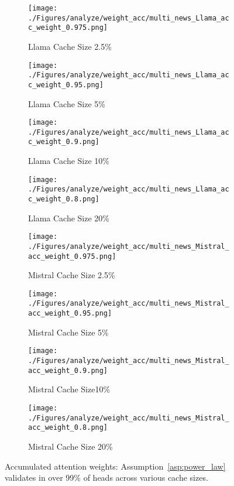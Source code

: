 {\begin{figure}[t]
	\begin{subfigure}[b]{0.245\linewidth}
		\texttt{[image: ./Figures/analyze/weight\_acc/multi\_news\_Llama\_acc\_weight\_0.975.png]}
		\caption{Llama Cache Size 2.5\%}
	\end{subfigure}
	\begin{subfigure}[b]{0.245\linewidth}
		\texttt{[image: ./Figures/analyze/weight\_acc/multi\_news\_Llama\_acc\_weight\_0.95.png]}
		\caption{Llama Cache Size 5\%}
	\end{subfigure}
	\begin{subfigure}[b]{0.245\linewidth}
		\texttt{[image: ./Figures/analyze/weight\_acc/multi\_news\_Llama\_acc\_weight\_0.9.png]}
		\caption{Llama Cache Size 10\%}
	\end{subfigure}
	\begin{subfigure}[b]{0.245\linewidth}
		\texttt{[image: ./Figures/analyze/weight\_acc/multi\_news\_Llama\_acc\_weight\_0.8.png]}
		\caption{Llama Cache Size 20\%}
	\end{subfigure}


	\begin{subfigure}[b]{0.245\linewidth}
		\texttt{[image: ./Figures/analyze/weight\_acc/multi\_news\_Mistral\_acc\_weight\_0.975.png]}
		\caption{Mistral Cache Size 2.5\%}
	\end{subfigure}
	\begin{subfigure}[b]{0.245\linewidth}
		\texttt{[image: ./Figures/analyze/weight\_acc/multi\_news\_Mistral\_acc\_weight\_0.95.png]}
		\caption{Mistral Cache Size 5\%}
	\end{subfigure}
	\begin{subfigure}[b]{0.245\linewidth}
		\texttt{[image: ./Figures/analyze/weight\_acc/multi\_news\_Mistral\_acc\_weight\_0.9.png]}
		\caption{Mistral Cache Size10\%}
	\end{subfigure}
	\begin{subfigure}[b]{0.245\linewidth}
		\texttt{[image: ./Figures/analyze/weight\_acc/multi\_news\_Mistral\_acc\_weight\_0.8.png]}
		\caption{Mistral Cache Size 20\%}
	\end{subfigure}
	\caption{Accumulated attention weights: Assumption~\ref{asp:power_law} validates in over 99\% of heads across various cache sizes.}
	\label{fig:check_asp}
\end{figure}
}


